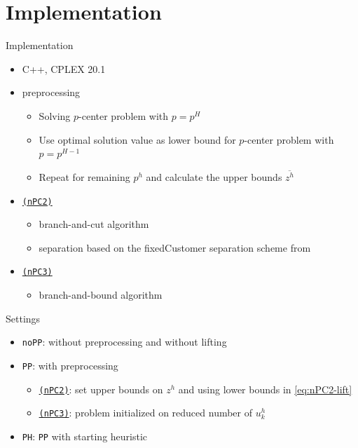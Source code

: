 \documentclass[utf8,aspectratio=1610,ngerman,english]{beamer}
\renewcommand{\emph}[1]{\textcolor{jkuGreen}{#1}}
\newcommand{\nPCE}{\hyperref[eq:nPCE]{\texttt{(nPC3)}}\xspace}
\newcommand{\nPCY}{\hyperref[eq:nPCY]{\texttt{(nPC2)}}\xspace}
\newcommand{\noPP}{\texttt{noPP}\xspace}
\newcommand{\PP}{\texttt{PP}\xspace}
\newcommand{\sH}{\texttt{PH}\xspace}
\begin{document}
\section{Implementation}
\begin{frame}{Implementation}
    \begin{itemize}
        \item \emph{C++, CPLEX} 20.1 \pause
        \item \emph{preprocessing}
              \begin{itemize}
                  \item Solving \emph{$p$-center problem} with $p = p^H$
                  \item Use optimal solution value as lower bound for \emph{$p$-center problem} with $p = p^{H-1}$
                  \item Repeat for remaining $p^h$ and calculate the upper bounds $\overline{z^h}$
              \end{itemize} \pause
        \item \nPCY
              \begin{itemize}
                  \item \emph{branch-and-cut} algorithm
                  \item separation based on the \emph{fixedCustomer} separation scheme from \cite{GAAR2022}
              \end{itemize} \pause
        \item \nPCE \pause
              \begin{itemize}
                  \item \emph{branch-and-bound} algorithm
              \end{itemize}
    \end{itemize}
\end{frame}
\begin{frame}{Settings}
    \begin{itemize}
        \setlength\itemsep{1em}
        \item \noPP: without \emph{preprocessing} and without \emph{lifting} \pause
        \item \PP: with \emph{preprocessing} \pause
              \begin{itemize}
                  \item \nPCY: set upper bounds on $z^h$ and using lower bounds in \eqref{eq:nPC2-lift}
                  \item \nPCE: problem initialized on reduced number of $u_k^h$
              \end{itemize}\pause
        \item \sH: \PP with \emph{starting heuristic}
    \end{itemize}
\end{frame}
\end{document}
